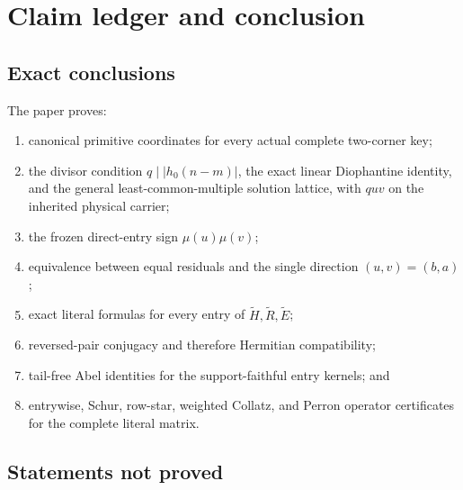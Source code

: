 \section{Claim ledger and conclusion}
\label{sec:claim-boundary}

\subsection{Exact conclusions}

The paper proves:
\begin{enumerate}[label=\textup{(\arabic*)},leftmargin=3em]
 \item canonical primitive coordinates for every actual complete
       two-corner key;
 \item the divisor condition \(q\mid|h_0(n-m)|\), the exact linear
       Diophantine identity, and the general least-common-multiple
       solution lattice, with \(quv\) on the inherited physical carrier;
 \item the frozen direct-entry sign \(\mu(u)\mu(v)\);
 \item equivalence between equal residuals and the single direction
       \((u,v)=(b,a)\);
 \item exact literal formulas for every entry of
       \(\widetilde H,\widetilde R,\widetilde E\);
 \item reversed-pair conjugacy and therefore Hermitian compatibility;
 \item tail-free Abel identities for the support-faithful entry kernels;
       and
 \item entrywise, Schur, row-star, weighted Collatz, and Perron operator
       certificates for the complete literal matrix.
\end{enumerate}

\subsection{Statements not proved}

